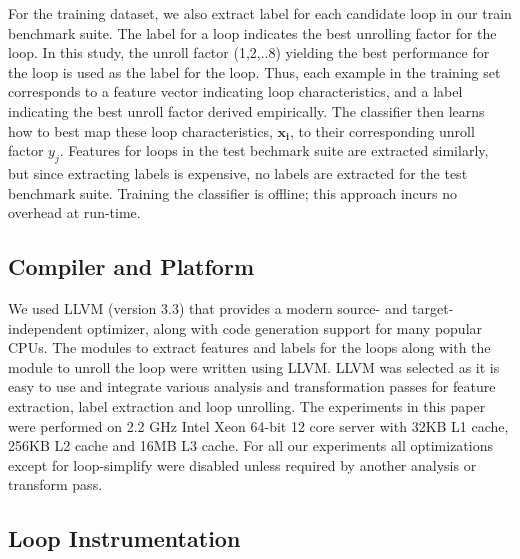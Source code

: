 \documentclass[]{sig-alternate}
\begin{document}
For the training dataset, we also extract label for each candidate loop in our train benchmark suite. The label for a loop indicates the best unrolling factor for the loop. In this study, the unroll factor (1,2,..8) yielding the best performance for the loop is used as the label for the loop. Thus, each example in the training set corresponds to a feature vector indicating loop characteristics, and a label indicating the best unroll factor derived empirically. The classifier then learns how to best map these loop characteristics, $\mathbf{x_i}$, to their corresponding unroll factor $y_j$. Features for loops in the test bechmark suite are extracted similarly, but since extracting labels is expensive, no labels are extracted for the test benchmark suite. Training the classifier is offline; this approach incurs no overhead at run-time. 

\subsection{Compiler and Platform}
\label{subsec:CompilerPlatform}

We used LLVM (version 3.3) that provides a modern source- and target-independent optimizer, along with code generation support for many popular CPUs. The modules to extract features and labels for the loops along with the module to unroll the loop were written using LLVM. LLVM was selected as it is easy to use and integrate various analysis and transformation passes for feature extraction, label extraction and loop unrolling.  The experiments in this paper were performed on 2.2 GHz Intel Xeon 64-bit 12 core server with 32KB L1 cache, 256KB L2 cache and 16MB L3 cache. For all our experiments all optimizations except for loop-simplify were disabled unless required by another analysis or transform pass. 


\subsection{Loop Instrumentation}
\label{subsec:LoopInstrumentation}
\end{document}
